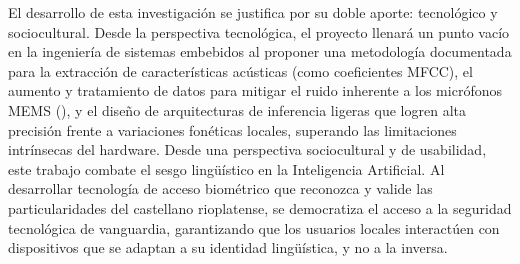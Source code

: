 El desarrollo de esta investigación se justifica por su doble aporte: tecnológico y 
sociocultural. Desde la perspectiva tecnológica, el proyecto llenará un punto vacío 
en la ingeniería de sistemas embebidos al proponer una metodología documentada para 
la extracción de características acústicas (como coeficientes MFCC), el aumento y 
tratamiento de datos para mitigar el ruido inherente a los micrófonos MEMS (\cite{ko2015}), 
y el diseño de arquitecturas de inferencia ligeras que logren alta precisión frente a variaciones 
fonéticas locales, superando las limitaciones intrínsecas del hardware. Desde una 
perspectiva sociocultural y de usabilidad, este trabajo combate el sesgo lingüístico 
en la Inteligencia Artificial. Al desarrollar tecnología de acceso biométrico que 
reconozca y valide las particularidades del castellano rioplatense, se democratiza 
el acceso a la seguridad tecnológica de vanguardia, garantizando que los usuarios 
locales interactúen con dispositivos que se adaptan a su identidad lingüística, 
y no a la inversa.




